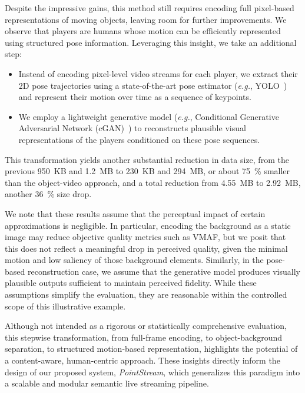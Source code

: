 \documentclass[manuscript, screen]{acmart}
\newcommand{\eg}{\emph{e.g.}, }
\begin{document}
Despite the impressive gains, this method still requires encoding full pixel-based representations of moving objects, leaving room for further improvements.
We observe that players are humans whose motion can be efficiently represented using structured pose information. 
Leveraging this insight, we take an additional step:
\begin{itemize}[topsep=0pt,itemsep=0pt,leftmargin=*]
\item Instead of encoding pixel-level video streams for each player, we extract their 2D pose trajectories using a state-of-the-art pose estimator (\eg YOLO~\cite{redmon2016yolo}) and represent their motion over time as a sequence of keypoints.
\item We employ a lightweight generative model (\eg  Conditional Generative
Adversarial Network (cGAN)~\cite{isola2017pix2pix}) to reconstructs plausible visual representations of the players conditioned on these pose sequences.
\end{itemize}
This transformation yields another substantial reduction in data size, from the previous \SI{950}{KB} and \SI{1.2}{MB} to \SI{230}{KB} and \SI{294}{MB}, or about \qty{75}{\percent} smaller than the object-video approach, and a total reduction from \SI{4.55}{MB} to \SI{2.92}{MB}, another \qty{36}{\percent} size drop.

We note that these results assume that the perceptual impact of certain approximations is negligible. 
In particular, encoding the background as a static image may reduce objective quality metrics such as VMAF, but we posit that this does not reflect a meaningful drop in perceived quality, given the minimal motion and low saliency of those background elements.
Similarly, in the pose-based reconstruction case, we assume that the generative model produces visually plausible outputs sufficient to maintain perceived fidelity. 
While these assumptions simplify the evaluation, they are reasonable within the controlled scope of this illustrative example.

Although not intended as a rigorous or statistically comprehensive evaluation, this stepwise transformation, from full-frame encoding, to object-background separation, to structured motion-based representation, highlights the potential of a content-aware, human-centric approach. 
These insights directly inform the design of our proposed system, \emph{PointStream}, which generalizes this paradigm into a scalable and modular semantic live streaming pipeline.
\end{document}
